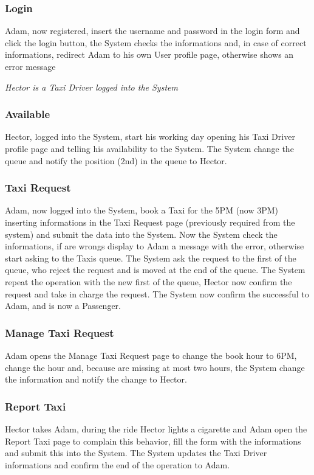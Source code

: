 \documentclass[english]{article}
\begin{document}
\subsubsection{Login}
Adam, now registered, insert the username and password in the login form and click the login button, the System checks the informations and, in case of correct informations, redirect Adam to his own User profile page, otherwise shows an error message

\emph{Hector is a Taxi Driver logged into the System}

\subsubsection{Available}
Hector, logged into the System, start his working day opening his Taxi Driver profile page and telling his availability to the System. The System change the queue and notify the position (2nd) in the queue to Hector.

\subsubsection{Taxi Request}
Adam, now logged into the System, book a Taxi for the 5PM (now 3PM) inserting informations in the Taxi Request page (previously required from the system) and submit the data into the System. Now the System check the informations, if are wrongs display to Adam a message with the error, otherwise start asking to the Taxis queue. The System ask the request to the first of the queue, who reject the request and is moved at the end of the queue. The System repeat the operation with the new first of the queue, Hector now confirm the request and take in charge the request. The System now confirm the successful to Adam, and is now a Passenger.

\subsubsection{Manage Taxi Request}
Adam opens the Manage Taxi Request page to change the book hour to 6PM, change the hour and, because are missing at most two hours, the System change the information and notify the change to Hector.

\subsubsection{Report Taxi}
Hector takes Adam, during the ride Hector lights a cigarette and Adam open the Report Taxi page to complain this behavior, fill the form with the informations and submit this into the System. The System updates the Taxi Driver informations and confirm the end of the operation to Adam.
\end{document}
